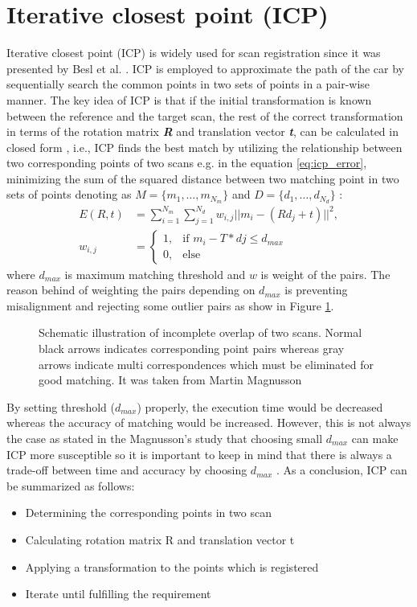 \section{Iterative closest point (ICP)}\label{icp}
Iterative closest point (ICP) is widely used for scan registration since it was presented by Besl et al. \cite{icp}. ICP is employed to approximate the path of the car by sequentially search the common points in two sets of points in a pair-wise manner. 
The key idea of ICP is that if the initial transformation is known between the reference and the target scan, the rest of the correct transformation in terms of the rotation matrix \textit{\textbf{R}} and translation vector \textit{\textbf{t}}, can be calculated in closed form \cite{icp1}, i.e., ICP finds the best match by utilizing the relationship between two corresponding points of two scans e.g. in the equation \eqref{eq:icp_error}, minimizing the sum of the squared distance between two matching point in two sets of points denoting as $M=\{m_1,\dots,m_{N_m}\}$ and $D=\{d_1,\dots,d_{N_d}\}$ \cite{icp4}:
\begin{align}\label{eq:icp_error}
    E(R,t)&=\sum_{i=1}^{N_m}\sum_{j=1}^{N_d}w_{i,j} ||m_i -(Rd_j+t)||^2,
    \\
    w_{i,j}&=\begin{cases}
    1, &\text{if $m_i-T*dj \leq d_{max}$}\\
    0, &\text{else}
\end{cases}%
\end{align}
where $d_{max}$ is maximum matching threshold and $w$ is weight of the pairs. The reason behind of weighting the pairs depending on $d_{max}$ is preventing misalignment and rejecting some outlier pairs as show in Figure \ref{fig:icp1}.
\begin{figure}[H]
  \centering
  \caption{Schematic illustration of incomplete overlap of two scans. Normal black arrows indicates corresponding point pairs whereas gray arrows indicate multi correspondences which must be eliminated for good matching. It was taken from Martin Magnusson \cite{icp2}}
  \label{fig:icp1}
\end{figure}
\vspace{-10pt}
By setting threshold ($d_{max}$) properly, the execution time would be decreased whereas the accuracy of matching would be increased. However, this is not always the case as stated in the Magnusson's study \cite{icp2} that choosing small $d_{max}$ can make ICP more susceptible so it is important to keep in mind that there is always a trade-off between time and accuracy by choosing $d_{max}$ \cite{icp3}. As a conclusion, ICP can be summarized as follows:
\begin{itemize}
    \item Determining the corresponding points in two scan
    \item Calculating rotation matrix R and translation vector t
    \item Applying a transformation to the points which is registered
    \item Iterate until fulfilling the requirement
\end{itemize}

